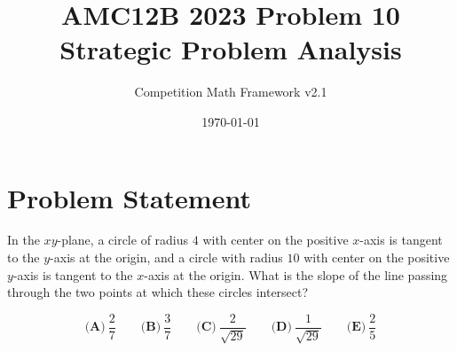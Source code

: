 \documentclass[12pt]{article}
\begin{document}
\title{AMC12B 2023 Problem 10\\Strategic Problem Analysis}
\author{Competition Math Framework v2.1}
\date{\today}
\maketitle

\section*{Problem Statement}

In the $xy$-plane, a circle of radius $4$ with center on the positive $x$-axis is tangent to the $y$-axis at the origin, and a circle with radius $10$ with center on the positive $y$-axis is tangent to the $x$-axis at the origin. What is the slope of the line passing through the two points at which these circles intersect?

$$\textbf{(A)}\ \dfrac{2}{7} \qquad\textbf{(B)}\ \dfrac{3}{7} \qquad\textbf{(C)}\ \dfrac{2}{\sqrt{29}} \qquad\textbf{(D)}\ \dfrac{1}{\sqrt{29}} \qquad\textbf{(E)}\ \dfrac{2}{5}$$
\end{document}
